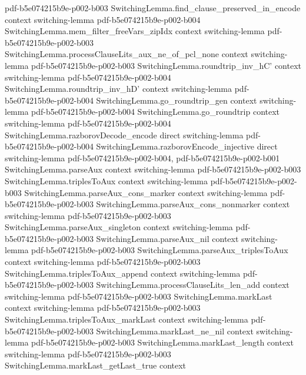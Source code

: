 \begin{lemma}
  {pdf-b5e074215b9e-p002-b003}
\proofstep
  {SwitchingLemma.find_clause_preserved_in_encode}
  {context}
  {switching-lemma}
  {pdf-b5e074215b9e-p002-b004}
\proofstep
  {SwitchingLemma.mem_filter_freeVars_zipIdx}
  {context}
  {switching-lemma}
  {pdf-b5e074215b9e-p002-b003}
\proofstep
  {SwitchingLemma.processClauseLits_aux_ne_of_pcl_none}
  {context}
  {switching-lemma}
  {pdf-b5e074215b9e-p002-b003}
\proofstep
  {SwitchingLemma.roundtrip_inv_hC'}
  {context}
  {switching-lemma}
  {pdf-b5e074215b9e-p002-b004}
\proofstep
  {SwitchingLemma.roundtrip_inv_hD'}
  {context}
  {switching-lemma}
  {pdf-b5e074215b9e-p002-b004}
\proofstep
  {SwitchingLemma.go_roundtrip_gen}
  {context}
  {switching-lemma}
  {pdf-b5e074215b9e-p002-b004}
\proofstep
  {SwitchingLemma.go_roundtrip}
  {context}
  {switching-lemma}
  {pdf-b5e074215b9e-p002-b004}
\proofstep
  {SwitchingLemma.razborovDecode_encode}
  {direct}
  {switching-lemma}
  {pdf-b5e074215b9e-p002-b004}
\proofstep
  {SwitchingLemma.razborovEncode_injective}
  {direct}
  {switching-lemma}
  {pdf-b5e074215b9e-p002-b004,
    pdf-b5e074215b9e-p002-b001}
\proofstep
  {SwitchingLemma.parseAux}
  {context}
  {switching-lemma}
  {pdf-b5e074215b9e-p002-b003}
\proofstep
  {SwitchingLemma.triplesToAux}
  {context}
  {switching-lemma}
  {pdf-b5e074215b9e-p002-b003}
\proofstep
  {SwitchingLemma.parseAux_cons_marker}
  {context}
  {switching-lemma}
  {pdf-b5e074215b9e-p002-b003}
\proofstep
  {SwitchingLemma.parseAux_cons_nonmarker}
  {context}
  {switching-lemma}
  {pdf-b5e074215b9e-p002-b003}
\proofstep
  {SwitchingLemma.parseAux_singleton}
  {context}
  {switching-lemma}
  {pdf-b5e074215b9e-p002-b003}
\proofstep
  {SwitchingLemma.parseAux_nil}
  {context}
  {switching-lemma}
  {pdf-b5e074215b9e-p002-b003}
\proofstep
  {SwitchingLemma.parseAux_triplesToAux}
  {context}
  {switching-lemma}
  {pdf-b5e074215b9e-p002-b003}
\proofstep
  {SwitchingLemma.triplesToAux_append}
  {context}
  {switching-lemma}
  {pdf-b5e074215b9e-p002-b003}
\proofstep
  {SwitchingLemma.processClauseLits_len_add}
  {context}
  {switching-lemma}
  {pdf-b5e074215b9e-p002-b003}
\proofstep
  {SwitchingLemma.markLast}
  {context}
  {switching-lemma}
  {pdf-b5e074215b9e-p002-b003}
\proofstep
  {SwitchingLemma.triplesToAux_markLast}
  {context}
  {switching-lemma}
  {pdf-b5e074215b9e-p002-b003}
\proofstep
  {SwitchingLemma.markLast_ne_nil}
  {context}
  {switching-lemma}
  {pdf-b5e074215b9e-p002-b003}
\proofstep
  {SwitchingLemma.markLast_length}
  {context}
  {switching-lemma}
  {pdf-b5e074215b9e-p002-b003}
\proofstep
  {SwitchingLemma.markLast_getLast_true}
  {context}

\end{lemma}
